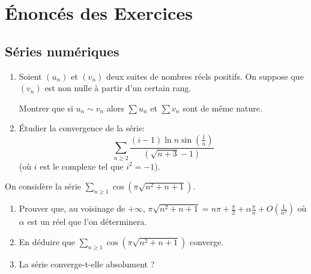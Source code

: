 \section{Énoncés des Exercices}
\subsection{Séries numériques}

\begin{exercice}
\begin{enumerate}
    \item Soient $(u_{n})$ et $(v_{n})$ deux suites de nombres réels positifs.
        On suppose que $(v_{n})$ est non nulle à partir d'un certain rang.
        
        Montrer que si $u_n \sim v_n$ alors $\sum u_n$ et $\sum v_n$ sont de même nature.

    \item Étudier la convergence de la série:
        \[\sum_{n\geqslant2}\frac{(i-1)\ln n \sin\left(\frac{1}{n}\right)}{(\sqrt{n+3}-1)}\]
        (où $i$ est le complexe tel que $i^2 = -1$).
\end{enumerate}
\end{exercice}

\begin{exercice}
    On considère la série $\sum_{n\geqslant1}\cos\left(\pi\sqrt{n^{2}+n+1}\right)$.
    \begin{enumerate}
        \item Prouver que, au voisinage de $+\infty$, $\pi\sqrt{n^{2}+n+1}=n\pi+\frac{\pi}{2}+\alpha\frac{\pi}{n}+O\left(\frac{1}{n^{2}}\right)$ 
            où $\alpha$ est un réel que l'on déterminera.
        \item En déduire que $\sum_{n\geqslant1}\cos\left(\pi\sqrt{n^{2}+n+1}\right)$ converge.
        \item La série converge-t-elle absolument ?
    \end{enumerate}
\end{exercice}

